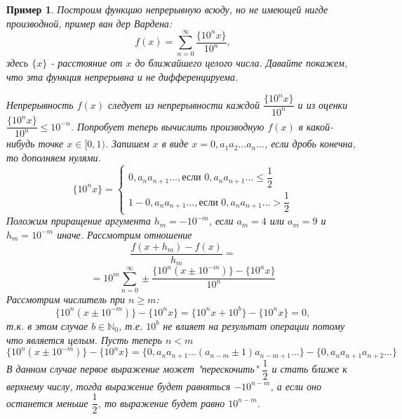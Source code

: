 \documentclass{book} %
\newtheorem{example}{Пример}[chapter] %
\theoremstyle{definition}
\theoremstyle{remark}
\begin{document}
		\begin{example}
		Построим функцию непрерывную всюду, но не имеющей нигде производной, пример ван дер Вардена:
			\begin{equation}
				f(x) = \sum\limits_{n=0}^{\infty} \dfrac{\{10^n x\}}{10^n}, 
			\end{equation}
			здесь $\{x\}$ - расстояние от $x$ до ближайшего целого числа. Давайте покажем, что эта функция непрерывна и не дифференцируема.
			\par
			Непрерывность $f(x)$ следует из непрерывности каждой $\dfrac{\{10^n x\}}{10^n}$ и из оценки $\dfrac{\{10^n x\}}{10^n} \leq 10^{-n}$. Попробует теперь вычислить производную $f(x)$ в какой-нибудь точке $x \in [0, 1)$. Запишем $x$ в виде $x = 0,a_1a_2\dots a_n\dots$, если дробь конечна, то дополняем нулями.
			\begin{equation*}
				\{10^n x\} = \begin{cases} 
					0,a_{n}a_{n+1}\dots, \text{если }	0,a_{n}a_{n+1}\dots \leq \dfrac12 \\
					1 - 0,a_{n}a_{n+1}\dots, \text{если } 0,a_{n}a_{n+1}\dots > \dfrac12
				\end{cases}
			\end{equation*}
			Положим приращение аргумента $h_m = - 10^{-m}$, если $a_m = 4$ или $a_m = 9$ и $h_m = 10^{-m}$ иначе. Рассмотрим отношение
			\begin{equation*}
				\dfrac{f(x+h_m) - f(x)}{h_m} = 
			\end{equation*}
			\begin{equation*}
				= 10^m \sum\limits_{n=0}^{\infty} \pm \dfrac{\{10^n(x\pm 10^{-m})\} - \{10^nx\}}{10^n}
			\end{equation*}
			Рассмотрим числитель при $n \geq m$:
			\begin{equation*}
				\{10^n(x\pm 10^{-m})\} - \{10^nx\} = \{ 10^nx + 10^b\} - \{10^nx\} = 0, 
			\end{equation*}
			т.к. в этом случае $b \in \mathbb{N}_0$, т.е. $10^b$ не влияет на результат операции потому что является целым. Пусть теперь $ n < m$
			\begin{equation*}
				\{10^n(x\pm 10^{-m})\} - \{10^nx\} = \{0,a_na_{n+1}\dots (a_{n-m} \pm 1) a_{n-m+1} \dots\} - \{0,a_na_{n+1}a_{n+2}\dots\}
			\end{equation*}
			В данном случае первое выражение может "перескочить"  $\dfrac12$ и стать ближе к верхнему числу, тогда выражение будет равняться $-10^{n-m}$, а если оно останется меньше $\dfrac12$, то выражение будет равно $10^{n-m}$. 
			

\end{example}
\end{document}
